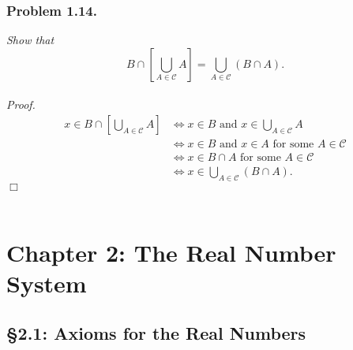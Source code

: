 \documentclass{article}
\begin{document}



\subsubsection*{Problem 1.14.}
\emph{Show that
$$B \cap \left[ \bigcup_{A \in \mathscr{C}} A \right]
= \bigcup_{A \in \mathscr{C}}(B \cap A).$$} \\

\emph{Proof.}
\begin{align*}
x \in B \cap \left[ \bigcup_{A \in \mathscr{C}} A \right]
& \Longleftrightarrow
x \in B \text{ and } x \in \bigcup_{A \in \mathscr{C}} A \\
& \Longleftrightarrow
x \in B \text{ and } x \in A \text{ for some } A \in \mathscr{C} \\
& \Longleftrightarrow
x \in B \cap A \text{ for some } A \in \mathscr{C} \\
& \Longleftrightarrow
x \in \bigcup_{A \in \mathscr{C}}(B \cap A).
\end{align*}
$\Box$ \\\\






\newpage
\section*{Chapter 2: The Real Number System \\}



\subsection*{\S 2.1: Axioms for the Real Numbers \\}
\end{document}
